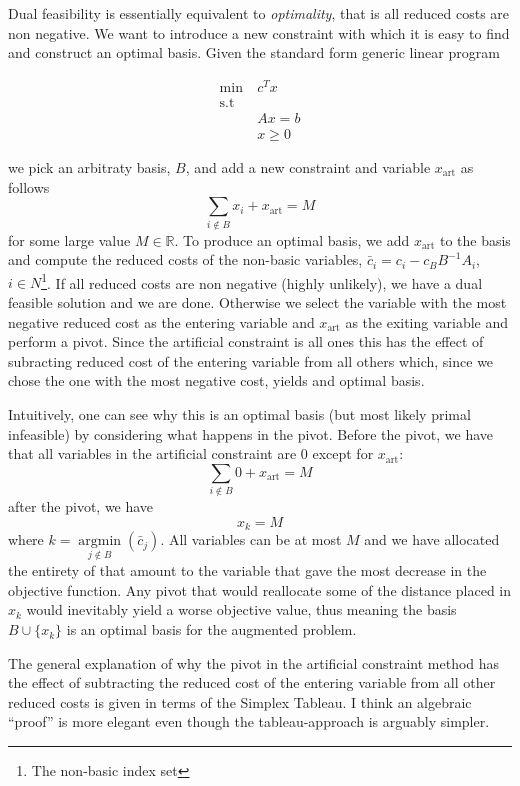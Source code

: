 Dual feasibility is essentially equivalent to \textit{optimality}, that is all reduced costs are non negative.
We want to introduce a new constraint with which it is easy to find and construct an optimal basis.
Given the standard form generic linear program

\begin{align*}
    \operatorname{min} \> & c^T x    \\
    \text{s.t}            &          \\
                          & A x = b  \\
                          & x \geq 0
\end{align*}

we pick an arbitraty basis, $B$, and add a new constraint and variable $x_\text{art}$ as follows
\[
    \sum_{i \notin B} x_i + x_\text{art} = M
\]
for some large value $M \in \mathbb{R}$.
To produce an optimal basis, we add $x_\text{art}$ to the basis and compute the reduced costs of the non-basic variables, $\bar{c}_i = c_i - c_B B^{-1} A_i$, $i \in N$\footnote{The non-basic index set}.
If all reduced costs are non negative (highly unlikely), we have a dual feasible solution and we are done.
Otherwise we select the variable with the most negative reduced cost as the entering variable and $x_\text{art}$ as the exiting variable and perform a pivot.
Since the artificial constraint is all ones this has the effect of subracting reduced cost of the entering variable from all others which, since we chose the one with the most negative cost, yields and optimal basis.

Intuitively, one can see why this is an optimal basis (but most likely primal infeasible) by considering what happens in the pivot.
Before the pivot, we have that all variables in the artificial constraint are 0 except for $x_\text{art}$:
\[
    \sum_{i \notin B} 0 + x_\text{art} = M
\]
after the pivot, we have
\[
    x_k = M
\]
where $k = \underset{j \notin B}{\operatorname{argmin}}(\bar{c}_j)$.
All variables can be at most $M$ and we have allocated the entirety of that amount to the variable that gave the most decrease in the objective function.
Any pivot that would reallocate some of the distance placed in $x_k$ would inevitably yield a worse objective value, thus meaning the basis $B \cup \{x_k\}$ is an optimal basis for the augmented problem.

The general explanation of why the pivot in the artificial constraint method has the effect of subtracting the reduced cost of the entering variable from all other reduced costs is given in terms of the Simplex Tableau.
I think an algebraic ``proof'' is more elegant even though the tableau-approach is arguably simpler.

